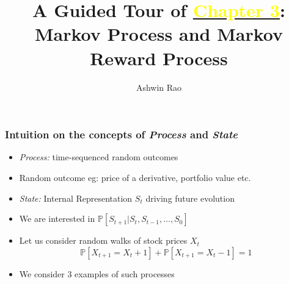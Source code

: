 \documentclass[handout]{beamer}
\title[Markov Process Chapter]{A Guided Tour of \href{http://stanford.edu/~ashlearn/RLForFinanceBook/book.pdf}{\underline{\textcolor{yellow}{Chapter 3}}}: \\  Markov Process and Markov Reward Process} %
\author{Ashwin Rao} %
\institute[Stanford] %
{ICME, Stanford University
}
\date %
\begin{document}
\lstset{language=Python}  
\begin{frame}
\titlepage %
\end{frame}


\begin{frame}
\frametitle{Intuition on the concepts of {\em Process} and {\em State}}
\pause
\begin{itemize}[<+->]
\item {\em Process:} time-sequenced random outcomes
\item Random outcome eg: price of a derivative, portfolio value etc.
\item {\em State:} Internal Representation $S_t$ driving future evolution
\item We are interested in $\mathbb{P}[S_{t+1}|S_t, S_{t-1}, \ldots, S_0]$
\item Let us consider random walks of stock prices $X_t $
$$\mathbb{P}[X_{t+1} = X_t + 1] + \mathbb{P}[X_{t+1} = X_t - 1] = 1$$
\item We consider 3 examples of such processes
\end{itemize}
\end{frame}
\end{document}
